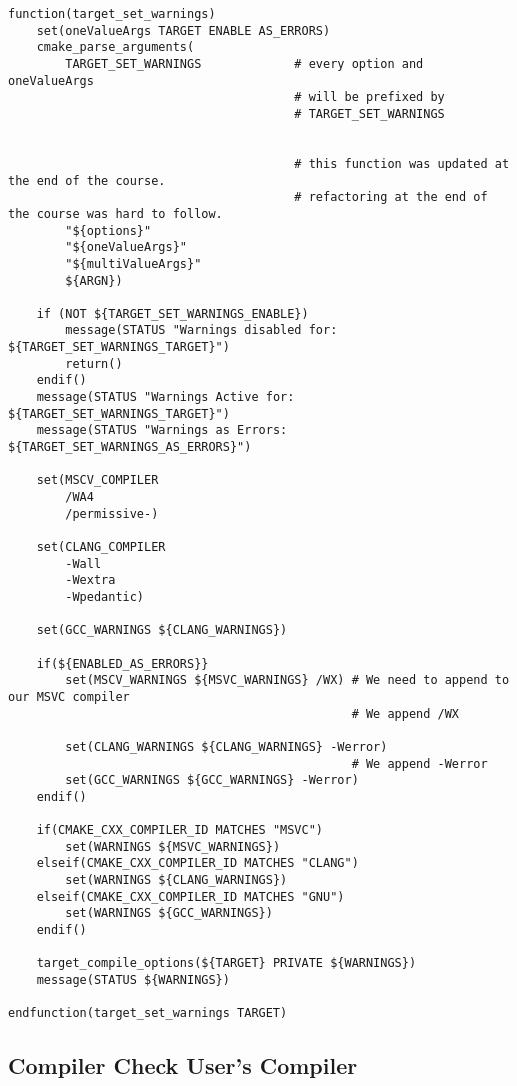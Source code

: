 \begin{verbatim}
function(target_set_warnings)
    set(oneValueArgs TARGET ENABLE AS_ERRORS)
    cmake_parse_arguments(
        TARGET_SET_WARNINGS             # every option and oneValueArgs
                                        # will be prefixed by
                                        # TARGET_SET_WARNINGS


                                        # this function was updated at the end of the course.
                                        # refactoring at the end of the course was hard to follow.
        "${options}"
        "${oneValueArgs}"
        "${multiValueArgs}"
        ${ARGN})

    if (NOT ${TARGET_SET_WARNINGS_ENABLE})
        message(STATUS "Warnings disabled for: ${TARGET_SET_WARNINGS_TARGET}")
        return()
    endif()
    message(STATUS "Warnings Active for: ${TARGET_SET_WARNINGS_TARGET}")
    message(STATUS "Warnings as Errors: ${TARGET_SET_WARNINGS_AS_ERRORS}")

    set(MSCV_COMPILER
        /WA4
        /permissive-)

    set(CLANG_COMPILER
        -Wall
        -Wextra
        -Wpedantic)

    set(GCC_WARNINGS ${CLANG_WARNINGS})

    if(${ENABLED_AS_ERRORS}}
        set(MSCV_WARNINGS ${MSVC_WARNINGS} /WX) # We need to append to our MSVC compiler
                                                # We append /WX

        set(CLANG_WARNINGS ${CLANG_WARNINGS} -Werror)
                                                # We append -Werror
        set(GCC_WARNINGS ${GCC_WARNINGS} -Werror)
    endif()

    if(CMAKE_CXX_COMPILER_ID MATCHES "MSVC")
        set(WARNINGS ${MSVC_WARNINGS})
    elseif(CMAKE_CXX_COMPILER_ID MATCHES "CLANG")
        set(WARNINGS ${CLANG_WARNINGS})
    elseif(CMAKE_CXX_COMPILER_ID MATCHES "GNU")
        set(WARNINGS ${GCC_WARNINGS})
    endif()

    target_compile_options(${TARGET} PRIVATE ${WARNINGS})
    message(STATUS ${WARNINGS})

endfunction(target_set_warnings TARGET)
\end{verbatim}

\subsection{Compiler Check User's Compiler}

